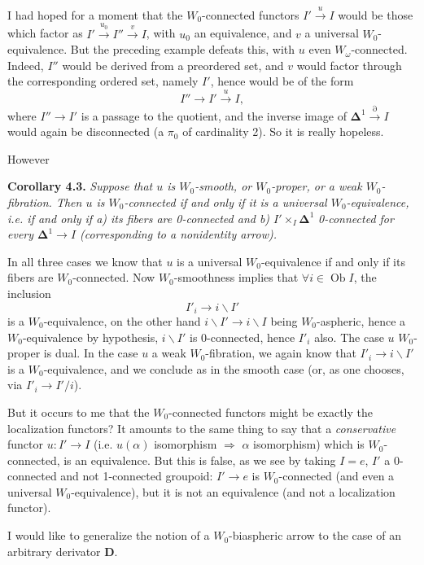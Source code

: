 \documentclass[11pt]{article}
\newcommand{\printedpage}[1]{\marginpar{\footnotesize p.~#1}}
\newcommand{\msp}[1]{\marginpar{\footnotesize [#1]}}
\newcommand{\Ob}{\operatorname{Ob}}
\newcommand{\bD}{\mathbf{D}}
\newcommand{\bDelta}{\boldsymbol{\Delta}}
\begin{document}
I had hoped for a moment that the $W_0$-connected functors $I' \xrightarrow{u} I$ would be those which factor as $I' \xrightarrow{u_0} I'' \xrightarrow{v} I$, with $u_0$ an equivalence, and $v$ a universal $W_0$-equivalence. But the preceding example defeats this, with $u$ even $W_\omega$-connected. Indeed, $I''$ would be derived from a preordered set, and $v$ would factor through the corresponding ordered set, namely $I'$, hence would be of the form
\[
I'' \longrightarrow I' \xrightarrow{u} I,
\]
where $I'' \longrightarrow I'$ is a passage to the quotient, and the inverse image of $\bDelta^1 \xrightarrow{\partial} I$ would again be disconnected (a $\pi_0$ of cardinality 2). So it is really hopeless.

However

\textbf{Corollary 4.3.} \textit{Suppose that $u$ is $W_0$-smooth, or $W_0$-proper, or a weak $W_0$-fibration. Then $u$ is $W_0$-connected if and only if it is a universal $W_0$-equivalence, i.e. if and only if a) its fibers are \textup{0}-connected and b) $I' \times_I \bDelta^1$} \textit{\textup{0}-connected for every $\bDelta^1 \longrightarrow I$ (corresponding to a nonidentity arrow).}

\msp{page 59}In all three cases we know that $u$ is a universal $W_0$-equivalence if and only if its fibers are $W_0$-connected. Now $W_0$-smoothness implies that $\forall i \in \Ob I$, the inclusion
\[
I'_i \longrightarrow i\backslash I'
\]
is a $W_0$-equivalence, on the other hand $i\backslash I' \longrightarrow i\backslash I$ being $W_0$-aspheric, hence a $W_0$-equivalence by hypothesis, $i\backslash I'$ is 0-connected, hence $I'_i$ also. The case $u$ $W_0$-proper is dual. In the case $u$ a weak $W_0$-fibration, we again know that $I'_i \longrightarrow i\backslash I'$ is a $W_0$-equivalence, and we conclude as in the smooth case (or, as one chooses, via $I'_i \longrightarrow I'/i$).

But it occurs to me that the $W_0$-connected functors might be exactly the localization functors? It amounts to the same thing to say that a \textit{conservative} functor $u : I' \longrightarrow I$ (i.e. $u(\alpha)$ isomorphism $\Longrightarrow$ $\alpha$ isomorphism) which is $W_0$-connected, is an equivalence. But this is false, as we see by taking $I = e$, $I'$ a 0-connected and not 1-connected groupoid: $I' \longrightarrow e$ is $W_0$-connected (and even a universal $W_0$-equivalence), but it is not an equivalence (and not a localization functor).

\printedpage{37}
\msp{page 60}I would like to generalize the notion of a $W_0$-biaspheric arrow to the case of an arbitrary derivator $\bD$.
\end{document}
